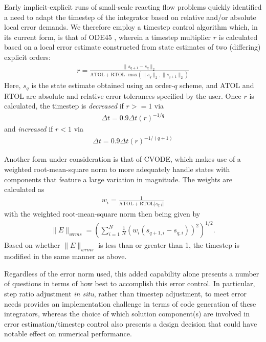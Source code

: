 Early implicit-explicit runs of small-scale reacting flow problems
quickly identified a need to adapt the timestep of the integrator based
on relative and/or absolute local error demands. We therefore employ a
timestep control algorithm which, in its current form, is that of ODE45 \cite{dormand1980family}, wherein
a timestep multiplier $r$ is calculated based on a local error estimate constructed from
state estimates of two (differing) explicit orders:
\begin{align}
r = \frac{\|s_{q+1} - s_{q}\|_{2}}{\text{ATOL} + \text{RTOL} \cdot \text{max}(\|s_{q}\|_{2}, \|s_{q+1}\|_{2})}
\end{align}
Here, $s_{q}$ is the state estimate obtained using an order-$q$ scheme, and ATOL and RTOL are absolute and
relative error tolerances specified by the user. Once $r$ is calculated, the timestep is \emph{decreased} if
$r>=1$ via
\begin{align}
\Delta t = 0.9\Delta t (r)^{-1/q}
\end{align}
and \emph{increased} if $r<1$ via
\begin{align}
\Delta t = 0.9\Delta t (r)^{-1/(q+1)}
\end{align}

Another form under consideration is that of CVODE, which makes use of a weighted
root-mean-square norm to more adequately handle states with components that
feature a large variation in magnitude. The weights are calculated as
\begin{align}
w_{i} = \frac{1}{\text{ATOL} + \text{RTOL} \lvert s_{q,i} \rvert}
\end{align}
with the weighted root-mean-square norm then being given by
\begin{align}
\|E\|_{wrms} = \left(\sum_{i=1}^{N} \frac{1}{N} (w_{i}(s_{q+1,i} - s_{q,i}))^2 \right)^{1/2}.
\end{align}
Based on whether $\|E\|_{wrms}$ is less than or greater than 1, the timestep
is modified in the same manner as above.

Regardless of the error norm used, this added capability alone presents a number of
questions in terms of how best to accomplish this error control. In particular,
step ratio adjustment \emph{in situ}, rather than timestep adjustment, to meet error
needs provides an implementation challenge in terms of code generation of these
integrators, whereas the choice of which solution component(s) are involved in error
estimation/timestep control also presents a design decision that could have notable
effect on numerical performance.

